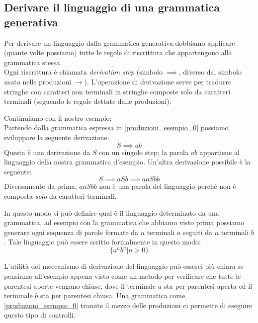 \documentclass[class=book, crop=false, oneside]{standalone}
\begin{document}
\subsection{Derivare il linguaggio di una grammatica generativa}
Per derivare un linguaggio dalla grammatica generativa dobbiamo applicare (quante volte possiamo) tutte le regole di riscrittura che appartengono alla grammatica stessa.\\
Ogni riscrittura è chiamata \emph{derivation step} (simbolo $\implies$, diverso dal simbolo usato nelle produzioni $\to$).
L’operazione di derivazione serve per tradurre stringhe con caratteri non terminali in stringhe composte solo da caratteri terminali (seguendo le regole dettate dalle produzioni).


Continuiamo con il nostro esempio:\\
Partendo dalla grammatica espressa in \ref{produzioni_esempio_0} possiamo sviluppare la seguente derivazione:
\begin{equation}
    S \implies ab
\end{equation}
Questa è una derivazione da $S$ con un singolo step; la parola $ab$ appartiene al linguaggio della nostra grammatica d’esempio.
Un'altra derivazione possibile è la seguente:
\begin{equation}
    S \implies aSb \implies aaSbb
\end{equation}
Diversamente da prima, $aaSbb$ non è una parola del linguaggio perché non è composta \emph{solo} da caratteri terminali.

In questo modo si può definire qual è il linguaggio determinato da una grammatica, ad esempio con la grammatica che abbiamo visto prima possiamo generare ogni sequenza di parole formate da $n$ terminali $a$ seguiti da $n$ terminali $b$.
Tale linguaggio può essere scritto formalmente in questo modo:
\begin{equation}
    \{a^n b^n |n>0\}
\end{equation}


L'utilità del meccanismo di derivazione del linguaggio può esserci più chiara se pensiamo all'esempio appena visto come un metodo per verificare che tutte le parentesi aperte vengano chiuse, dove il terminale $a$ sta per parentesi aperta ed il terminale $b$ sta per parentesi chiusa. Una grammatica come \ref{produzioni_esempio_0} tramite il mezzo delle produzioni ci permette di eseguire questo tipo di controlli.
\end{document}
